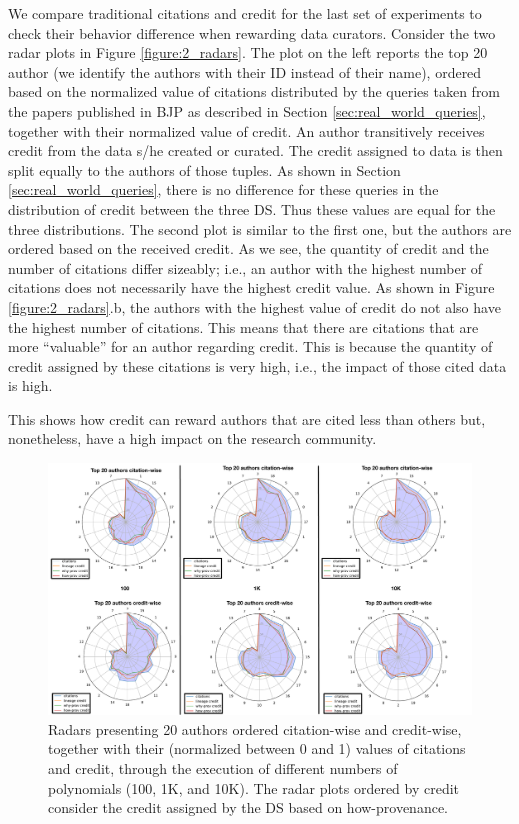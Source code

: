 We compare traditional citations and credit for the last set of experiments to check their behavior difference when rewarding data curators.
Consider the two radar plots in Figure \ref{figure:2_radars}.
The plot on the left reports the top 20 author (we identify the authors with their ID instead of their name), ordered based on the normalized value of citations distributed by the queries taken from the papers published in BJP as described in Section \ref{sec:real_world_queries}, together with their normalized value of credit. 
An author transitively receives credit from the data s/he created or curated. The credit assigned to data is then split equally to the authors of those tuples. 
As shown in Section \ref{sec:real_world_queries}, there is no difference for these queries in the distribution of credit between the three DS. Thus these values are equal for the three distributions.  
The second plot is similar to the first one, but the authors are ordered based on the received credit. 
As we see, the quantity of credit and the number of citations differ sizeably; i.e., an author with the highest number of citations does not necessarily have the highest credit value. 
As shown in Figure \ref{figure:2_radars}.b, the authors with the highest value of credit do not also have the highest number of citations. 
This means that there are citations that are more ``valuable'' for an author regarding credit. This is because the quantity of credit assigned by these citations is very high, i.e., the impact of those cited data is high. 

This shows how credit can reward authors that are cited less than others but, nonetheless, have a high impact on the research community. 


\begin{figure}[t]
\centering
  \includegraphics[width=1\textwidth]{figures/3_radars}
  \caption{Radars presenting 20 authors ordered citation-wise and credit-wise, together with their (normalized between 0 and 1) values of citations and credit, through the execution of different numbers of polynomials (100, 1K, and 10K). The radar plots ordered by credit consider the credit assigned by the DS based on how-provenance.}
  \label{figure:3_radars}
\end{figure}

